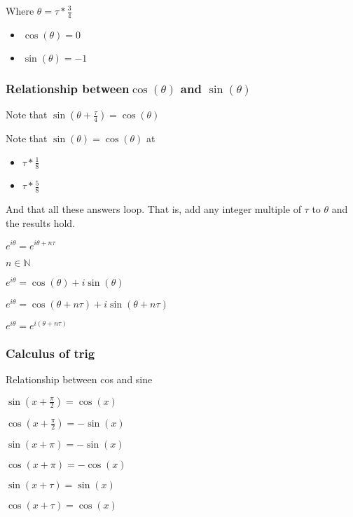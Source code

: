 Where \(\theta =\tau *\frac{3}{4}\)

\begin{itemize}
\item \(\cos (\theta )=0\)
\item \(\sin (\theta )=-1\)
\end{itemize}

\subsubsection{Relationship between\( \cos (\theta )\) and \(\sin(\theta )\)}

Note that \(\sin(\theta + \frac{\tau }{4})=\cos(\theta )\)

Note that \(\sin (\theta )=\cos (\theta )\) at

\begin{itemize}
\item \(\tau *\frac{1}{8}\)
\item \(\tau *\frac{5}{8}\)
\end{itemize}

And that all these answers loop. That is, add any integer multiple of \(\tau \) to \(\theta \) and the results hold.

\(e^{i\theta } = e^{i\theta +n\tau }\)

\(n \in \mathbb{N}\)

\(e^{i\theta } = \cos(\theta )+i\sin(\theta )\)

\(e^{i\theta } = \cos(\theta +n\tau )+i\sin(\theta +n\tau ) \)

\(e^{i\theta } = e^{i(\theta +n\tau )}\)


\subsubsection{Calculus of trig}

Relationship between cos and sine

\(\sin(x+\frac{\pi }{2})=\cos(x)\)

\(\cos(x+\frac{\pi }{2})=-\sin(x)\)

\(\sin(x+\pi )=-\sin(x)\)

\(\cos(x+\pi )=-\cos(x)\)

\(\sin(x+\tau )=\sin(x)\)

\(\cos(x+\tau )=\cos(x)\)

